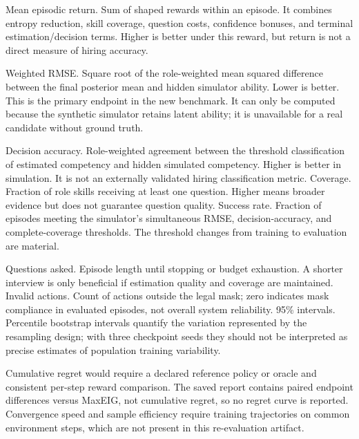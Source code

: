 \documentclass{ieeeaccess}
\begin{document}
Mean episodic return. Sum of shaped rewards within an episode. It combines entropy reduction, skill coverage, question costs, confidence bonuses, and terminal estimation/decision terms. Higher is better under this reward, but return is not a direct measure of hiring accuracy.

Weighted RMSE. Square root of the role-weighted mean squared difference between the final posterior mean and hidden simulator ability. Lower is better. This is the primary endpoint in the new benchmark. It can only be computed because the synthetic simulator retains latent ability; it is unavailable for a real candidate without ground truth.

Decision accuracy. Role-weighted agreement between the threshold classification of estimated competency and hidden simulated competency. Higher is better in simulation. It is not an externally validated hiring classification metric. Coverage. Fraction of role skills receiving at least one question. Higher means broader evidence but does not guarantee question quality. Success rate. Fraction of episodes meeting the simulator's simultaneous RMSE, decision-accuracy, and complete-coverage thresholds. The threshold changes from training to evaluation are material.

Questions asked. Episode length until stopping or budget exhaustion. A shorter interview is only beneficial if estimation quality and coverage are maintained. Invalid actions. Count of actions outside the legal mask; zero indicates mask compliance in evaluated episodes, not overall system reliability. 95\% intervals. Percentile bootstrap intervals quantify the variation represented by the resampling design; with three checkpoint seeds they should not be interpreted as precise estimates of population training variability.

Cumulative regret would require a declared reference policy or oracle and consistent per-step reward comparison. The saved report contains paired endpoint differences versus MaxEIG, not cumulative regret, so no regret curve is reported. Convergence speed and sample efficiency require training trajectories on common environment steps, which are not present in this re-evaluation artifact.
\end{document}
